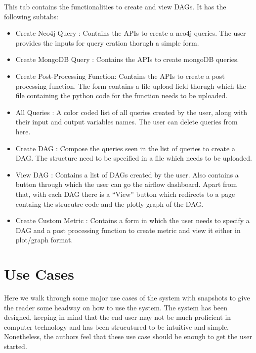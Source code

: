 \documentclass[letterpaper,10pt,english]{sphinxmanual}
\begin{document}
This tab contains the functionalities to create and view DAGs. It has the following subtabs:
\begin{itemize}
\item {} 
Create Neo4j Query : Contains the APIs to create a neo4j queries. The user provides the inputs for query cration thorugh a simple form.

\item {} 
Create MongoDB Query : Contains the APIs to create mongoDB queries.

\item {} 
Create Post-Processing Function: Contains the APIs to create a post processing function. The form contains a file upload field thorugh which the file containing the python code for the function needs to be uploaded.

\item {} 
All Queries : A color coded list of all queries created by the user, along with their input and output variables names. The user can delete queries from here.

\item {} 
Create DAG : Compose the queries seen in the list of queries to create a DAG. The structure need to be specified in a file which needs to be uploaded.

\item {} 
View DAG : Contains a list of DAGs created by the user. Also contains a button through which the user can go the airflow dashboard. Apart from that, with each DAG there is a “View” button which redirects to a page containg the strucutre code and the plotly graph of the DAG.

\item {} 
Create Custom Metric : Contains a form in which the user needs to specify a DAG and a post processing function to create metric and view it either in plot/graph format.

\end{itemize}


\section{Use Cases}
\label{\detokenize{dashboard_website:use-cases}}
Here we walk through some major use cases of the system with snapshots to give the reader some headway on how to use the system. The system has been designed, keeping in mind that the end user may not be much proficient in computer technology and has been strucutured to be intuitive and simple. Nonetheless, the authors feel that these use case should be enough to get the user started.
\end{document}
